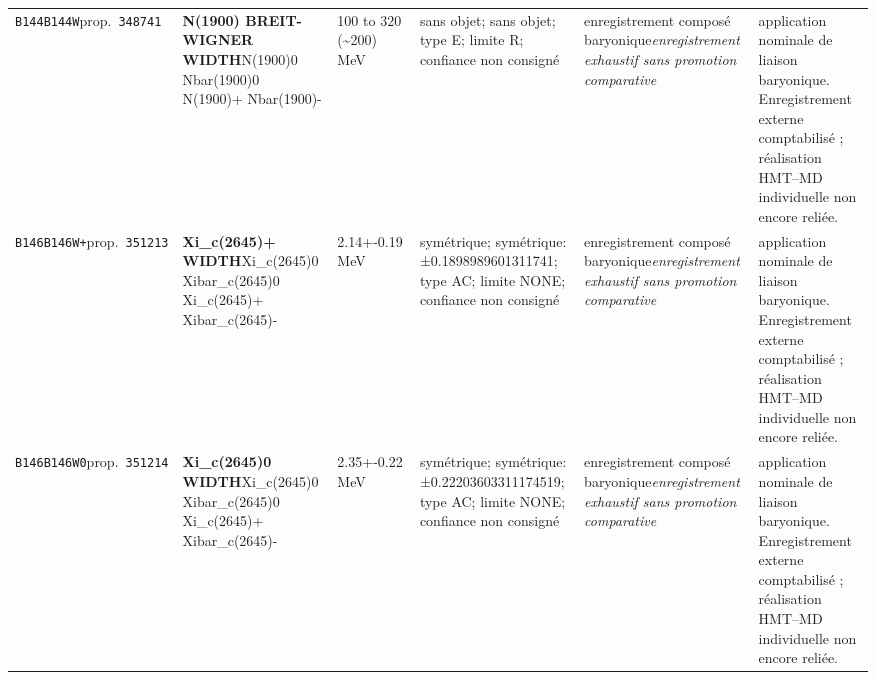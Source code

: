 \begin{landscape}
\begin{longtable}{L{1.85cm}L{4.45cm}L{2.35cm}L{4.05cm}L{3.35cm}L{7.15cm}}
\texttt{B144}\newline \texttt{B144W}\newline prop.\ \texttt{348741} & \textbf{N(1900) BREIT-WIGNER WIDTH}\newline N(1900)0 \textbar{}\allowbreak{} Nbar(1900)0 \textbar{}\allowbreak{} N(1900)+ \textbar{}\allowbreak{} Nbar(1900)- & 100 to 320 (\textasciitilde{}200)\,MeV & sans objet; sans objet; type E; limite R; confiance non consigné & enregistrement composé baryonique\newline \emph{enregistrement exhaustif sans promotion comparative} & application nominale de liaison baryonique. Enregistrement externe comptabilisé ; réalisation HMT--MD individuelle non encore reliée. \\
\texttt{B146}\newline \texttt{B146W+}\newline prop.\ \texttt{351213} & \textbf{Xi\_\allowbreak{}c(2645)+ WIDTH}\newline Xi\_\allowbreak{}c(2645)0 \textbar{}\allowbreak{} Xibar\_\allowbreak{}c(2645)0 \textbar{}\allowbreak{} Xi\_\allowbreak{}c(2645)+ \textbar{}\allowbreak{} Xibar\_\allowbreak{}c(2645)- & 2.14+-0.19\,MeV & symétrique; symétrique: ±0.1898989601311741; type AC; limite NONE; confiance non consigné & enregistrement composé baryonique\newline \emph{enregistrement exhaustif sans promotion comparative} & application nominale de liaison baryonique. Enregistrement externe comptabilisé ; réalisation HMT--MD individuelle non encore reliée. \\
\texttt{B146}\newline \texttt{B146W0}\newline prop.\ \texttt{351214} & \textbf{Xi\_\allowbreak{}c(2645)0 WIDTH}\newline Xi\_\allowbreak{}c(2645)0 \textbar{}\allowbreak{} Xibar\_\allowbreak{}c(2645)0 \textbar{}\allowbreak{} Xi\_\allowbreak{}c(2645)+ \textbar{}\allowbreak{} Xibar\_\allowbreak{}c(2645)- & 2.35+-0.22\,MeV & symétrique; symétrique: ±0.22203603311174519; type AC; limite NONE; confiance non consigné & enregistrement composé baryonique\newline \emph{enregistrement exhaustif sans promotion comparative} & application nominale de liaison baryonique. Enregistrement externe comptabilisé ; réalisation HMT--MD individuelle non encore reliée. \\

\end{longtable}
\end{landscape}
